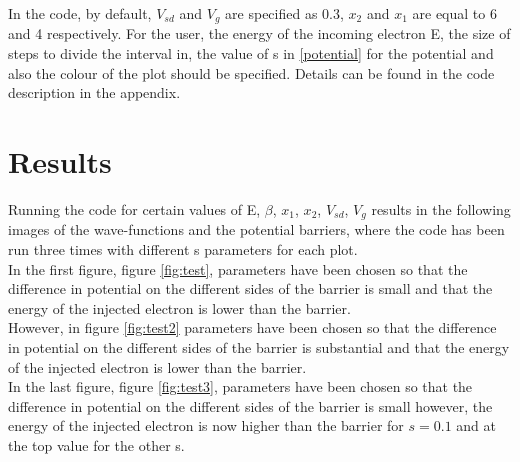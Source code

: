 \documentclass[a4paper]{article}
\begin{document}
In the code, by default, $V_{sd}$ and $V_g$ are specified as $0.3$, $x_2$ and $x_1$ are equal to 6 and 4 respectively.
For the user, the energy of the incoming electron E, the size of steps to divide the interval in, the value of s in \eqref{potential} for the potential and also the colour of the plot should be specified. Details can be found in the code description in the appendix.

\section{Results}
Running the code for certain values of E, $\beta$, $x_1$, $x_2$, $V_{sd}$, $V_g$ results in the following images of the wave-functions and the potential barriers, where the code has been run three times with different s parameters for each plot.
\\
In the first figure, figure \ref{fig:test}, parameters have been chosen so that the difference in potential on the different sides of the barrier is small and that the energy of the injected electron is lower than the barrier. 
\\
However, in figure \ref{fig:test2} parameters have been chosen so that the difference in potential on the different sides of the barrier is substantial and that the energy of the injected electron is lower than the barrier. 
\\
In the last figure, figure \ref{fig:test3}, parameters have been chosen so that the difference in potential on the different sides of the barrier is small however, the energy of the injected electron is now higher than the barrier for $s=0.1$ and at the top value for the other s. 
\end{document}
